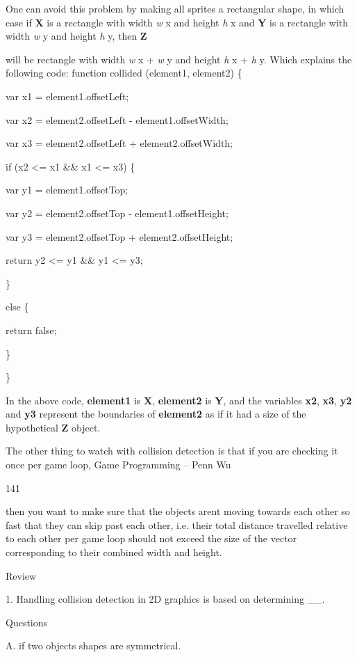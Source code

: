 \documentclass[
]{article}
\begin{document}
One can avoid this problem by making all sprites a rectangular shape, in
which case if \textbf{X} is a rectangle with width \emph{w} x and height
\emph{h} x and \textbf{Y} is a rectangle with width \emph{w} y and
height \emph{h} y, then \textbf{Z}

will be rectangle with width \emph{w} x + \emph{w} y and height \emph{h}
x + \emph{h} y. Which explains the following code: function collided
(element1, element2) \{

var x1 = element1.offsetLeft;

var x2 = element2.offsetLeft - element1.offsetWidth;

var x3 = element2.offsetLeft + element2.offsetWidth;

if (x2 \textless= x1 \&\& x1 \textless= x3) \{

var y1 = element1.offsetTop;

var y2 = element2.offsetTop - element1.offsetHeight;

var y3 = element2.offsetTop + element2.offsetHeight;

return y2 \textless= y1 \&\& y1 \textless= y3;

\}

else \{

return false;

\}

\}

In the above code, \textbf{element1} is \textbf{X}, \textbf{element2} is
\textbf{Y}, and the variables \textbf{x2}, \textbf{x3}, \textbf{y2} and
\textbf{y3} represent the boundaries of \textbf{element2} as if it had a
size of the hypothetical \textbf{Z} object.

The other thing to watch with collision detection is that if you are
checking it once per game loop, Game Programming -- Penn Wu

141

\protect\hypertarget{index_split_009.htmlux5cux23p142}{}{}then you want
to make sure that the objects aren\textquotesingle t moving towards each
other so fast that they can skip past each other, i.e. their total
distance travelled relative to each other per game loop should not
exceed the size of the vector corresponding to their combined width and
height.

Review

1. Handling collision detection in 2D graphics is based on determining
\_\_.

Questions

A. if two objects\textquotesingle{} shapes are symmetrical.
\end{document}
